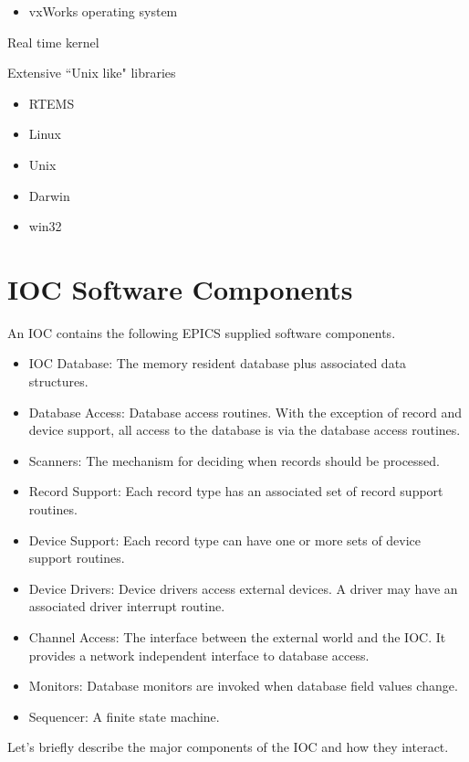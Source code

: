 \begin{itemize}\item vxWorks operating system

\end{itemize}Real time kernel

Extensive ``Unix like" libraries

\begin{itemize}\item RTEMS

\item Linux

\item Unix

\item Darwin

\item win32

\end{itemize}\section{IOC Software Components}

An IOC contains the following EPICS supplied software components.

\begin{itemize}\item IOC Database: The memory resident database plus associated data structures.

\item Database Access:  Database access routines. With the exception of record and device support, all access to the 
database is via the database access routines.

\item Scanners:  The mechanism for deciding when records should be processed.

\item Record Support:  Each record type has an associated set of record support routines.

\item Device Support: Each record type can have one or more sets of device support routines.

\item Device Drivers:  Device drivers access external devices. A driver may have an associated driver interrupt routine.

\item Channel Access:  The interface between the external world and the IOC. It provides a network independent 
interface to database access.

\item Monitors:  Database monitors are invoked when database field values change.

\item Sequencer:  A finite state machine.

\end{itemize}Let's briefly describe the major components of the IOC and how they interact.

